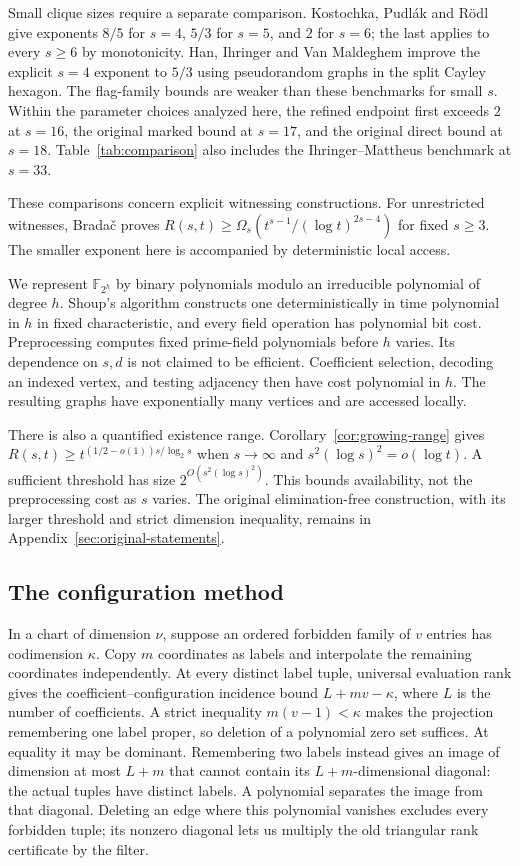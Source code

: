 \documentclass[11pt,a4paper]{article}
\newcommand{\F}{\mathbb F}
\theoremstyle{definition}
\theoremstyle{remark}
\numberwithin{equation}{section}
\begin{document}
Small clique sizes require a separate comparison. Kostochka, Pudl\'ak and R\"odl \cite{KPR} give exponents $8/5$ for $s=4$, $5/3$ for $s=5$, and $2$ for $s=6$; the last applies to every $s\ge6$ by monotonicity. Han, Ihringer and Van Maldeghem \cite{HIV} improve the explicit $s=4$ exponent to $5/3$ using pseudorandom graphs in the split Cayley hexagon. The flag-family bounds are weaker than these benchmarks for small $s$. Within the parameter choices analyzed here, the refined endpoint first exceeds $2$ at $s=16$, the original marked bound at $s=17$, and the original direct bound at $s=18$. Table~\ref{tab:comparison} also includes the Ihringer--Mattheus benchmark at $s=33$.

These comparisons concern explicit witnessing constructions. For unrestricted witnesses, Brada\v{c} \cite{Bradac} proves $R(s,t)\ge\Omega_s(t^{s-1}/(\log t)^{2s-4})$ for fixed $s\ge3$. The smaller exponent here is accompanied by deterministic local access.

We represent $\F_{2^h}$ by binary polynomials modulo an irreducible polynomial of degree $h$. Shoup's algorithm \cite{Shoup} constructs one deterministically in time polynomial in $h$ in fixed characteristic, and every field operation has polynomial bit cost. Preprocessing computes fixed prime-field polynomials before $h$ varies. Its dependence on $s,d$ is not claimed to be efficient. Coefficient selection, decoding an indexed vertex, and testing adjacency then have cost polynomial in $h$. The resulting graphs have exponentially many vertices and are accessed locally.

There is also a quantified existence range. Corollary~\ref{cor:growing-range} gives $R(s,t)\ge t^{(1/2-o(1))s/\log_2s}$ when $s\to\infty$ and $s^2(\log s)^2=o(\log t)$. A sufficient threshold has size $2^{O(s^2(\log s)^2)}$. This bounds availability, not the preprocessing cost as $s$ varies. The original elimination-free construction, with its larger threshold and strict dimension inequality, remains in Appendix~\ref{sec:original-statements}.

\subsection{The configuration method}
In a chart of dimension $\nu$, suppose an ordered forbidden family of $v$ entries has codimension $\kappa$. Copy $m$ coordinates as labels and interpolate the remaining coordinates independently. At every distinct label tuple, universal evaluation rank gives the coefficient--configuration incidence bound $L+mv-\kappa$, where $L$ is the number of coefficients. A strict inequality $m(v-1)<\kappa$ makes the projection remembering one label proper, so deletion of a polynomial zero set suffices. At equality it may be dominant. Remembering two labels instead gives an image of dimension at most $L+m$ that cannot contain its $L+m$-dimensional diagonal: the actual tuples have distinct labels. A polynomial separates the image from that diagonal. Deleting an edge where this polynomial vanishes excludes every forbidden tuple; its nonzero diagonal lets us multiply the old triangular rank certificate by the filter.
\end{document}
